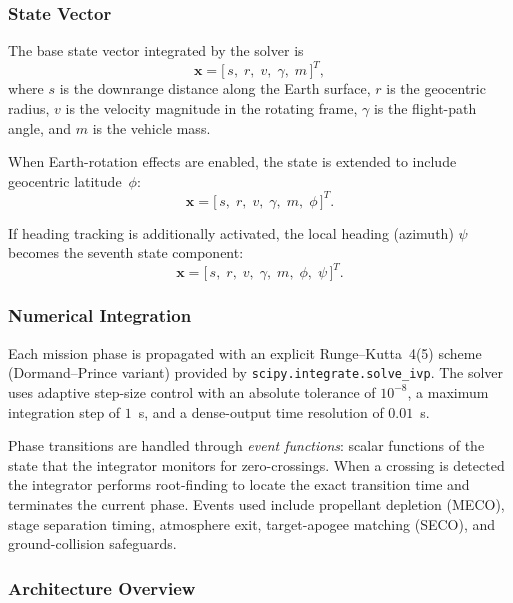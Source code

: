 \subsubsection{State Vector}

The base state vector integrated by the solver is
\begin{equation}
  \mathbf{x} = \bigl[\,s,\; r,\; v,\; \gamma,\; m\,\bigr]^T,
  \label{eq:state_base}
\end{equation}
where $s$ is the downrange distance along the Earth surface, $r$ is the
geocentric radius, $v$ is the velocity magnitude in the rotating frame,
$\gamma$ is the flight-path angle, and $m$ is the vehicle mass.

When Earth-rotation effects are enabled, the state is extended to include
geocentric latitude~$\phi$:
\begin{equation}
  \mathbf{x} = \bigl[\,s,\; r,\; v,\; \gamma,\; m,\; \phi\,\bigr]^T.
  \label{eq:state_rot}
\end{equation}

If heading tracking is additionally activated, the local heading (azimuth)
$\psi$ becomes the seventh state component:
\begin{equation}
  \mathbf{x} = \bigl[\,s,\; r,\; v,\; \gamma,\; m,\; \phi,\; \psi\,\bigr]^T.
  \label{eq:state_heading}
\end{equation}

\subsubsection{Numerical Integration}

Each mission phase is propagated with an explicit Runge--Kutta~4(5) scheme
(Dormand--Prince variant) provided by \texttt{scipy.integrate.solve\_ivp}.  The
solver uses adaptive step-size control with an absolute tolerance of
$10^{-8}$, a maximum integration step of $1$~s, and a dense-output time
resolution of $0.01$~s.

Phase transitions are handled through \emph{event functions}: scalar functions
of the state that the integrator monitors for zero-crossings.  When a crossing
is detected the integrator performs root-finding to locate the exact transition
time and terminates the current phase.  Events used include propellant
depletion (MECO), stage separation timing, atmosphere exit, target-apogee
matching (SECO), and ground-collision safeguards.

\subsubsection{Architecture Overview}

